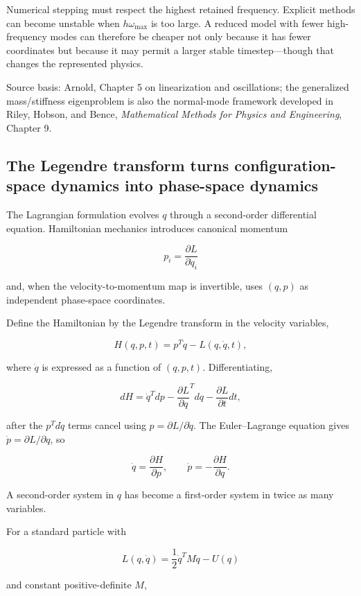 Numerical stepping must respect the highest retained frequency. Explicit methods can become unstable when \(h\omega_{\max}\) is too large. A reduced model with fewer high-frequency modes can therefore be cheaper not only because it has fewer coordinates but because it may permit a larger stable timestep---though that changes the represented physics.

Source basis: Arnold, Chapter 5 on linearization and oscillations; the generalized mass/stiffness eigenproblem is also the normal-mode framework developed in Riley, Hobson, and Bence, \emph{Mathematical Methods for Physics and Engineering}, Chapter 9.

\subsection{The Legendre transform turns configuration-space dynamics into phase-space dynamics}\label{06-engine-ii-ch033-the-legendre-transform-turns-configuration-space-dynamics-into-phase-space-dynamics}

The Lagrangian formulation evolves \(q\) through a second-order differential equation. Hamiltonian mechanics introduces canonical momentum

\[
p_i
=
\frac{\partial L}{\partial\dot q_i}
\]

and, when the velocity-to-momentum map is invertible, uses \((q,p)\) as independent phase-space coordinates.

Define the Hamiltonian by the Legendre transform in the velocity variables,

\[
H(q,p,t)
=
p^T\dot q-L(q,\dot q,t),
\]

where \(\dot q\) is expressed as a function of \((q,p,t)\). Differentiating,

\[
dH
=
\dot q^Tdp
-
\frac{\partial L}{\partial q}^Tdq
-
\frac{\partial L}{\partial t}dt,
\]

after the \(p^Td\dot q\) terms cancel using \(p=\partial L/\partial\dot q\). The Euler--Lagrange equation gives \(\dot p=\partial L/\partial q\), so

\[
\boxed{
\dot q=
\frac{\partial H}{\partial p},
\qquad
\dot p=
-\frac{\partial H}{\partial q}.
}
\]

A second-order system in \(q\) has become a first-order system in twice as many variables.

For a standard particle with

\[
L(q,\dot q)
=
\frac12\dot q^TM\dot q-U(q)
\]

and constant positive-definite \(M\),

